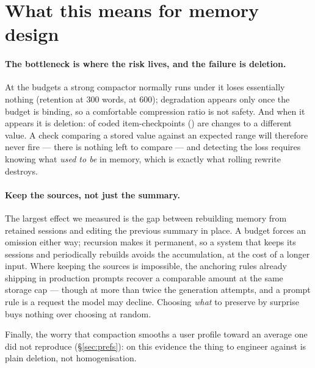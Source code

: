 \section{What this means for memory design}
\label{sec:discussion}

\paragraph{The bottleneck is where the risk lives, and the failure is deletion.} At the budgets a
strong compactor normally runs under it loses essentially nothing (retention
\RetentionBThreeHundred{} at 300 words, \RetentionBSixHundred{} at 600); degradation appears only once
the budget is binding, so a comfortable compression ratio is not safety. And when it appears it is
deletion: \ChangedCount{} of \NCodedCases{} coded item-checkpoints (\ChangedRate{}) are changes to a
different value. A check comparing a stored value against an expected range will therefore never fire
--- there is nothing left to compare --- and detecting the loss requires knowing what \emph{used to
be} in memory, which is exactly what rolling rewrite destroys.

\paragraph{Keep the sources, not just the summary.} The largest effect we measured is the gap between
rebuilding memory from retained sessions and editing the previous summary in place. A budget forces an
omission either way; recursion makes it permanent, so a system that keeps its sessions and periodically
rebuilds avoids the accumulation, at the cost of a longer input.
Where keeping the sources is impossible, the anchoring rules already shipping in production prompts
recover a comparable amount at the same storage cap --- though at more than twice the generation
attempts,
and a prompt rule is a request the model may decline. Choosing \emph{what} to
preserve by surprise buys nothing over choosing at random.

Finally, the worry that compaction smooths a user profile toward an average one did not reproduce
(\S\ref{sec:prefs}): on this evidence the thing to engineer against is plain deletion, not
homogenisation.
